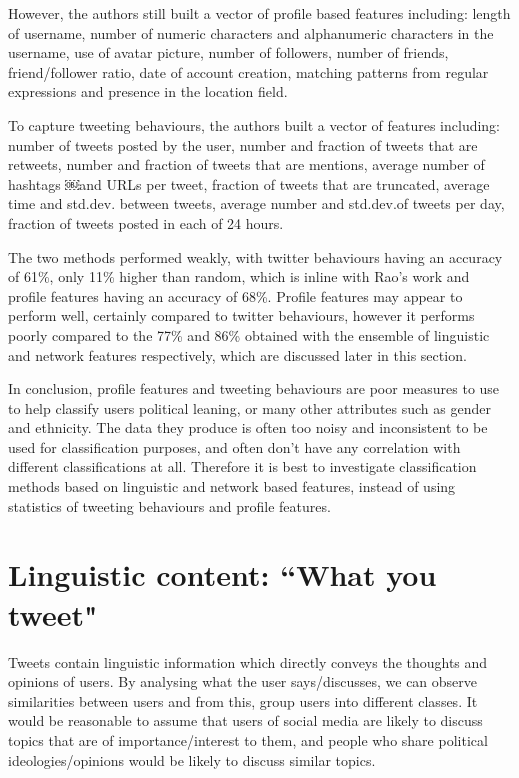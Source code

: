 \documentclass[bsc,frontabs,singlespacing,parskip]{infthesis}     %
\begin{document}
However, the authors still built a vector of profile based features including: length of username, number of numeric characters and alphanumeric characters in the username, use of avatar picture, number of followers, number of friends, friend/follower ratio, date of account creation, matching patterns from regular expressions and presence in the location field.

To capture tweeting behaviours, the authors built a vector of features including: number of tweets posted by the user, number and fraction of tweets that are retweets, number and fraction of tweets that are mentions, average number of hashtags ￼and URLs per tweet, fraction of tweets that are truncated, average time and std.dev. between tweets, average number and std.dev.of tweets per day, fraction of tweets posted in each of 24 hours.

The two methods performed weakly, with twitter behaviours having an accuracy of 61\%, only 11\% higher than random, which is inline with Rao's work and profile features having an accuracy of 68\%. Profile features may appear to perform well, certainly compared to twitter behaviours, however it performs poorly compared to the 77\% and 86\% obtained with the ensemble of linguistic and network features respectively, which are discussed later in this section. 

In conclusion, profile features and tweeting behaviours are poor measures to use to help classify users political leaning, or many other attributes such as gender and ethnicity. The data they produce is often too noisy and inconsistent to be used for classification purposes, and often don't have any correlation with different classifications at all. Therefore it is best to investigate classification methods based on linguistic and network based features, instead of using statistics of tweeting behaviours and profile features.

\section{Linguistic content: ``What you tweet"}
\label{sec:lingcont}

Tweets contain linguistic information which directly conveys the thoughts and opinions of users. By analysing what the user says/discusses, we can observe similarities between users and from this, group users into different classes. It would be reasonable to assume that users of social media are likely to discuss topics that are of importance/interest to them, and people who share political ideologies/opinions would be likely to discuss similar topics. 
\end{document}
